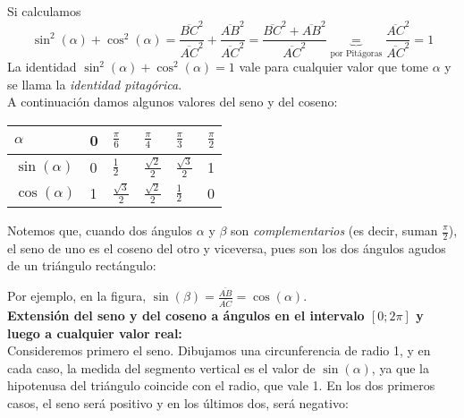 \documentclass[../Teoría.root.tex]{subfiles}
\begin{document}
        Si calculamos \[\sin^2(\alpha)+\cos^2(\alpha)=\frac{\overline{BC}^2}{\overline{AC}^2}+\frac{\overline{AB}^2}{\overline{AC}^2}=\frac{\overline{BC}^2+\overline{AB}^2}{\overline{AC}^2}\underbrace{=}_{\text{por Pitágoras}}\frac{\overline{AC}^2}{\overline{AC}^2}=1\]
        La identidad \(\sin^2(\alpha) + \cos^2(\alpha) = 1\) vale para cualquier valor que tome \(\alpha\) y se llama la \textit{identidad pitagórica}.\\
        A continuación damos algunos valores del seno y del coseno:
        \begin{center}
            \begin{tabularx}{\textwidth}{|X|X|X|X|X|X|}
                \hline
                \(\alpha\) & 0 & \(\frac{\pi}{6}\) & \(\frac{\pi}{4}\) & \(\frac{\pi}{3}\) & \(\frac{\pi}{2}\)\\\hline
                \(\sin(\alpha)\) & 0 & \(\frac{1}{2}\) & \(\frac{\sqrt{2}}{2}\) & \(\frac{\sqrt{3}}{2}\) & 1\\\hline
                \(\cos(\alpha)\) & 1 & \(\frac{\sqrt{3}}{2}\) & \(\frac{\sqrt{2}}{2}\) & \(\frac{1}{2}\) & 0\\\hline
            \end{tabularx}
        \end{center}
        Notemos que, cuando dos ángulos \(\alpha\) y \(\beta\) son \textit{complementarios} (es decir, suman \(\frac{\pi}{2}\)), el seno de uno es el coseno del otro y viceversa, pues son los dos ángulos agudos de un triángulo rectángulo:
        \begin{center}
        \end{center}
        Por ejemplo, en la figura, \(\sin(\beta)=\frac{\overline{AB}}{\overline{AC}}=\cos(\alpha)\).\\
        \textbf{Extensión del seno y del coseno a ángulos en el intervalo \([0; 2\pi]\) y luego a cualquier valor real:}\\
        Consideremos primero el seno. Dibujamos una circunferencia de radio 1, y en cada caso, la medida del segmento vertical es el valor de \(\sin(\alpha)\), ya que la hipotenusa del triángulo coincide con el radio, que vale 1. En los dos primeros casos, el seno será positivo y en los últimos dos, será negativo:
\end{document}
